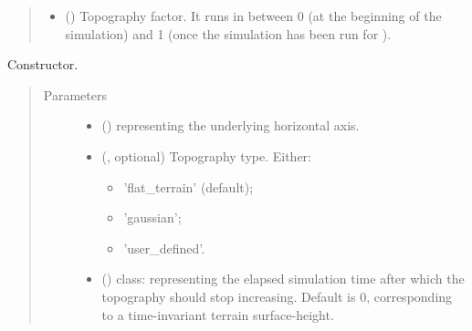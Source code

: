 \documentclass[letterpaper,10pt,english]{sphinxmanual}
\begin{document}
\begin{fulllineitems}
\begin{quote}
\begin{description}
\begin{itemize}
\item {} 
 () \textendash{} Topography factor. It runs in between 0 (at the beginning of the simulation) and 1 (once the simulation
has been run for ).

\end{itemize}

\end{description}\end{quote}

\begin{fulllineitems}
\label{\detokenize{api:tasmania.grids.topography.Topography1d.__init__}}
Constructor.
\begin{quote}\begin{description}
\item[{Parameters}] \leavevmode\begin{itemize}
\item {} 
 () \textendash{} {\hyperref[\detokenize{api:tasmania.grids.axis.Axis}]{}} representing the underlying horizontal axis.

\item {} 
 (, optional) \textendash{} 
Topography type. Either:
\begin{itemize}
\item {} 
’flat\_terrain’ (default);

\item {} 
’gaussian’;

\item {} 
’user\_defined’.

\end{itemize}


\item {} 
 () \textendash{} class: representing the elapsed simulation time after which the topography
should stop increasing. Default is 0, corresponding to a time-invariant terrain surface-height.

\end{itemize}


\end{description}
\end{quote}
\end{fulllineitems}
\end{fulllineitems}
\end{document}
